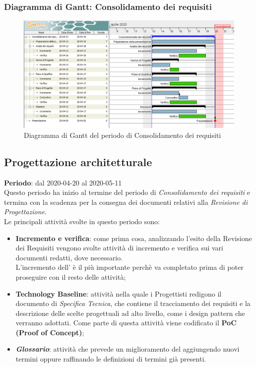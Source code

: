 	\subsubsection{Diagramma di Gantt: Consolidamento dei requisiti}
		\begin{figure}[h]
			\centering
			\includegraphics[width=1.1\textwidth]{./res/img/DiagrammiGantt/cons_req_gantt.png}
			\caption{Diagramma di Gantt del periodo di Consolidamento dei requisiti}
		\end{figure}
\newpage
\subsection{Progettazione architetturale}
\textbf{Periodo}: dal 2020-04-20 al 2020-05-11 \\
Questo periodo ha inizio al termine del periodo di \textit{Consolidamento dei requisiti} e termina con la scadenza per la consegna dei documenti relativi alla \textit{Revisione di Progettazione}. \\
Le principali attività svolte in questo periodo sono:
\begin{itemize}
	\item \textbf{Incremento e verifica}: come prima cosa, analizzando l'esito della Revisione dei Requisiti vengono svolte attività di incremento e verifica sui vari documenti redatti, dove necessario. \\
	L'incremento dell'\AdR{} è il più importante perchè va completato prima di poter proseguire con il resto delle attività;
	\item \textbf{Technology Baseline}: attività nella quale i Progettisti redigono il documento di \textit{Specifica Tecnica}, che contiene il tracciamento dei requisiti e la descrizione delle scelte progettuali ad alto livello, come i design pattern che verranno adottati. Come parte di questa attività viene codificato il \textbf{PoC (Proof of Concept)};
	\item \textbf{\textit{Glossario}}: attività che prevede un miglioramento del \Glossario aggiungendo nuovi termini oppure raffinando le definizioni di termini già presenti.
\end{itemize}
